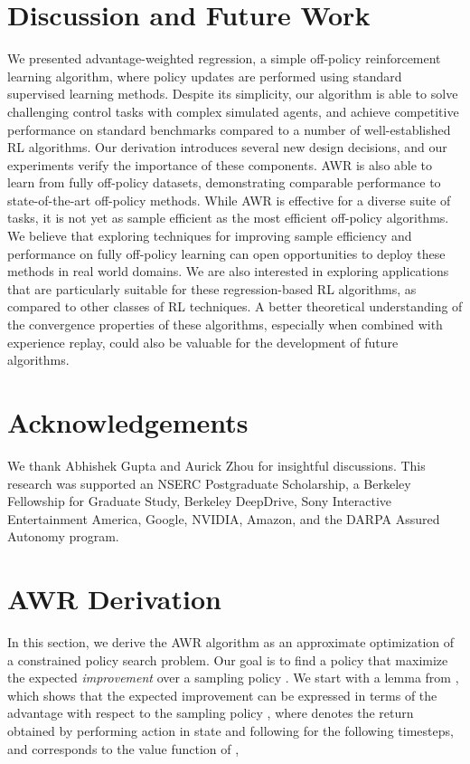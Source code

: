 \documentclass{article} \usepackage{iclr2020_conference,times}
\begin{document}
\section{Discussion and Future Work}
We presented advantage-weighted regression, a simple off-policy reinforcement learning algorithm, where policy updates are performed using standard supervised learning methods. Despite its simplicity, our algorithm is able to solve challenging control tasks with complex simulated agents, and achieve competitive performance on standard benchmarks compared to a number of well-established RL algorithms. Our derivation introduces several new design decisions, and our experiments verify the importance of these components. AWR is also able to learn from fully off-policy datasets, demonstrating comparable performance to state-of-the-art off-policy methods. While AWR is effective for a diverse suite of tasks, it is not yet as sample efficient as the most efficient off-policy algorithms. We believe that exploring techniques for improving sample efficiency and performance on fully off-policy learning can open opportunities to deploy these methods in real world domains. We are also interested in exploring applications that are particularly suitable for these regression-based RL algorithms, as compared to other classes of RL techniques. A better theoretical understanding of the convergence properties of these algorithms, especially when combined with experience replay, could also be valuable for the development of future algorithms.

\section*{Acknowledgements}
We thank Abhishek Gupta and Aurick Zhou for insightful discussions. This research was supported an NSERC Postgraduate Scholarship, a Berkeley Fellowship for Graduate Study, Berkeley DeepDrive, Sony Interactive Entertainment America, Google, NVIDIA, Amazon, and the DARPA Assured Autonomy program.




\newpage

\appendix
\section{AWR Derivation}
\label{app:Derivation}

In this section, we derive the AWR algorithm as an approximate optimization of a constrained policy search problem. Our goal is to find a policy that maximize the expected \emph{improvement}  over a sampling policy . We start with a lemma from \citet{Kakade2002}, which shows that the expected improvement can be expressed in terms of the advantage  with respect to the sampling policy , where  denotes the return obtained by performing action  in state  and following  for the following timesteps, and  corresponds to the value function of ,
\end{document}
